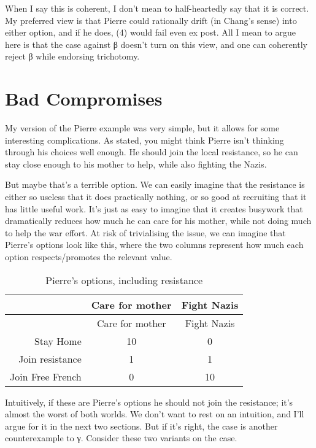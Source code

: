 \documentclass[
  11pt,
  letterpaper,
  DIV=11,
  numbers=noendperiod,
  twoside]{scrartcl}
\begin{document}
When I say this is coherent, I don't mean to half-heartedly say that it
is correct. My preferred view is that Pierre could rationally drift (in
Chang's sense) into either option, and if he does, (4) would fail even
ex post. All I mean to argue here is that the case against β doesn't
turn on this view, and one can coherently reject β while endorsing
trichotomy.

\section{Bad Compromises}\label{sec-badcomp}

My version of the Pierre example was very simple, but it allows for some
interesting complications. As stated, you might think Pierre isn't
thinking through his choices well enough. He should join the local
resistance, so he can stay close enough to his mother to help, while
also fighting the Nazis.

But maybe that's a terrible option. We can easily imagine that the
resistance is either so useless that it does practically nothing, or so
good at recruiting that it has little useful work. It's just as easy to
imagine that it creates busywork that dramatically reduces how much he
can care for his mother, while not doing much to help the war effort. At
risk of trivialising the issue, we can imagine that Pierre's options
look like this, where the two columns represent how much each option
respects/promotes the relevant value.

\begin{longtable}[]{@{}rcc@{}}
\caption{Pierre's options, including
resistance}\label{tbl-pierreresist}\tabularnewline
\toprule\noalign{}
& Care for mother & Fight Nazis \\
\midrule\noalign{}
\endfirsthead
\toprule\noalign{}
& Care for mother & Fight Nazis \\
\midrule\noalign{}
\endhead
\bottomrule\noalign{}
\endlastfoot
Stay Home & 10 & 0 \\
Join resistance & 1 & 1 \\
Join Free French & 0 & 10 \\
\end{longtable}

Intuitively, if these are Pierre's options he should not join the
resistance; it's almost the worst of both worlds. We don't want to rest
on an intuition, and I'll argue for it in the next two sections. But if
it's right, the case is another counterexample to γ. Consider these two
variants on the case.
\end{document}
